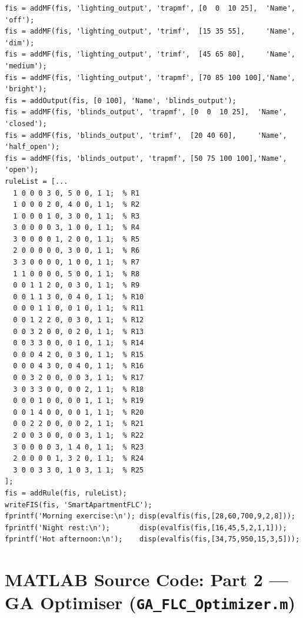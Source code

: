 \documentclass[10pt,twocolumn,a4paper]{article}
\begin{document}
\begin{lstlisting}[caption={Part 1: Mamdani FLC construction, MF definition, rule base, control surfaces, and 24-hour simulation.}]
fis = addMF(fis, 'lighting_output', 'trapmf', [0  0  10 25],  'Name', 'off');
fis = addMF(fis, 'lighting_output', 'trimf',  [15 35 55],     'Name', 'dim');
fis = addMF(fis, 'lighting_output', 'trimf',  [45 65 80],     'Name', 'medium');
fis = addMF(fis, 'lighting_output', 'trapmf', [70 85 100 100],'Name', 'bright');
fis = addOutput(fis, [0 100], 'Name', 'blinds_output');
fis = addMF(fis, 'blinds_output', 'trapmf', [0  0  10 25],  'Name', 'closed');
fis = addMF(fis, 'blinds_output', 'trimf',  [20 40 60],     'Name', 'half_open');
fis = addMF(fis, 'blinds_output', 'trapmf', [50 75 100 100],'Name', 'open');
ruleList = [...
  1 0 0 0 3 0, 5 0 0, 1 1;  % R1
  1 0 0 0 2 0, 4 0 0, 1 1;  % R2
  1 0 0 0 1 0, 3 0 0, 1 1;  % R3
  3 0 0 0 0 3, 1 0 0, 1 1;  % R4
  3 0 0 0 0 1, 2 0 0, 1 1;  % R5
  2 0 0 0 0 0, 3 0 0, 1 1;  % R6
  3 3 0 0 0 0, 1 0 0, 1 1;  % R7
  1 1 0 0 0 0, 5 0 0, 1 1;  % R8
  0 0 1 1 2 0, 0 3 0, 1 1;  % R9
  0 0 1 1 3 0, 0 4 0, 1 1;  % R10
  0 0 0 1 1 0, 0 1 0, 1 1;  % R11
  0 0 1 2 2 0, 0 3 0, 1 1;  % R12
  0 0 3 2 0 0, 0 2 0, 1 1;  % R13
  0 0 3 3 0 0, 0 1 0, 1 1;  % R14
  0 0 0 4 2 0, 0 3 0, 1 1;  % R15
  0 0 0 4 3 0, 0 4 0, 1 1;  % R16
  0 0 3 2 0 0, 0 0 3, 1 1;  % R17
  3 0 3 3 0 0, 0 0 2, 1 1;  % R18
  0 0 0 1 0 0, 0 0 1, 1 1;  % R19
  0 0 1 4 0 0, 0 0 1, 1 1;  % R20
  0 0 2 2 0 0, 0 0 2, 1 1;  % R21
  2 0 0 3 0 0, 0 0 3, 1 1;  % R22
  3 0 0 0 0 3, 1 4 0, 1 1;  % R23
  2 0 0 0 0 1, 3 2 0, 1 1;  % R24
  3 0 0 3 3 0, 1 0 3, 1 1;  % R25
];
fis = addRule(fis, ruleList);
writeFIS(fis, 'SmartApartmentFLC');
fprintf('Morning exercise:\n'); disp(evalfis(fis,[28,60,700,9,2,8]));
fprintf('Night rest:\n');       disp(evalfis(fis,[16,45,5,2,1,1]));
fprintf('Hot afternoon:\n');    disp(evalfis(fis,[34,75,950,15,3,5]));
\end{lstlisting}

\section{MATLAB Source Code: Part 2 --- GA Optimiser (\texttt{GA\_FLC\_Optimizer.m})}
\label{app:part2}
\end{document}
